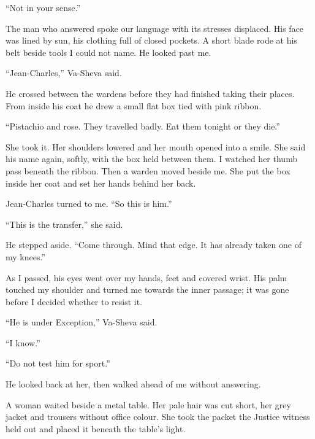 ``Not in your sense.''\par

The man who answered spoke our language with its stresses displaced. His face was lined by sun, his clothing full of closed pockets. A short blade rode at his belt beside tools I could not name. He looked past me.\par

``Jean-Charles,'' Va-Sheva said.\par

He crossed between the wardens before they had finished taking their places. From inside his coat he drew a small flat box tied with pink ribbon.\par

``Pistachio and rose. They travelled badly. Eat them tonight or they die.''\par

She took it. Her shoulders lowered and her mouth opened into a smile. She said his name again, softly, with the box held between them. I watched her thumb pass beneath the ribbon. Then a warden moved beside me. She put the box inside her coat and set her hands behind her back.\par

Jean-Charles turned to me. ``So this is him.''\par

``This is the transfer,'' she said.\par

He stepped aside. ``Come through. Mind that edge. It has already taken one of my knees.''\par

As I passed, his eyes went over my hands, feet and covered wrist. His palm touched my shoulder and turned me towards the inner passage; it was gone before I decided whether to resist it.\par

``He is under Exception,'' Va-Sheva said.\par

``I know.''\par

``Do not test him for sport.''\par

He looked back at her, then walked ahead of me without answering.\par

\ornament

A woman waited beside a metal table. Her pale hair was cut short, her grey jacket and trousers without office colour. She took the packet the Justice witness held out and placed it beneath the table's light.\par

